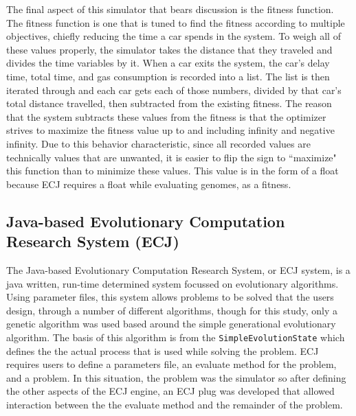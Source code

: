 The final aspect of this simulator that bears discussion is the fitness function.  The fitness function is one that is tuned to find the fitness according to multiple objectives, chiefly reducing the time a car spends in the system.  To weigh all of these values properly, the simulator takes the distance that they traveled and divides the time variables by it.  When a car exits the system, the car's delay time, total time, and gas consumption is recorded into a list.  The list is then iterated through and each car gets each of those numbers, divided by that car's total distance travelled, then subtracted from the existing fitness.  The reason that the system subtracts these values from the fitness is that the optimizer strives to maximize the fitness value up to and including infinity and negative infinity.  Due to this behavior characteristic, since all recorded values are technically values that are unwanted, it is easier to flip the sign to ``maximize" this function than to minimize these values.  This value is in the form of a float because ECJ requires a float while evaluating genomes, as a fitness.

\subsection{Java-based Evolutionary Computation Research System (ECJ)}

The Java-based Evolutionary Computation Research System, or ECJ system, is a java written, run-time determined system focussed on evolutionary algorithms.  Using parameter files, this system allows problems to be solved that the users design, through a number of different algorithms, though for this study, only a genetic algorithm was used based around the simple generational evolutionary algorithm.  The basis of this algorithm is from the \texttt{SimpleEvolutionState} which defines the the actual process that is used while solving the problem.  ECJ requires users to define a parameters file, an evaluate method for the problem, and a problem.  In this situation, the problem was the simulator so after defining the other aspects of the ECJ engine, an ECJ plug was developed that allowed interaction between the the evaluate method and the remainder of the problem.\cite{GAMANUAL}   

